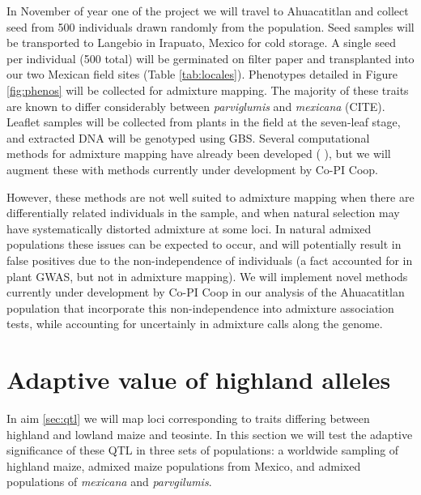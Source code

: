 In November of year one of the project we will travel to Ahuacatitlan and collect seed from 500 individuals drawn randomly from the population.  Seed samples will be transported to Langebio in Irapuato, Mexico for cold storage. A single seed per individual (500 total) will be germinated on filter paper and transplanted into our two Mexican field sites (Table \ref{tab:locales}).  Phenotypes detailed in Figure \ref{fig:phenos} will be collected for admixture mapping.  The majority of these traits are known to differ considerably between \emph{parviglumis} and \emph{mexicana} (CITE).  Leaflet samples will be collected from plants in the field at the seven-leaf stage, and extracted DNA will be genotyped using GBS.  Several computational methods for admixture mapping have already been developed (  \citet{winkler2010admixture}), but we will augment these with methods currently under development by Co-PI Coop.  

However, these methods are not well suited to admixture mapping when there are differentially related individuals in the sample, and when natural selection may have systematically distorted admixture at some loci. In natural admixed populations these issues can be expected to occur, and will potentially result in false positives due to the non-independence of individuals (a fact accounted for in plant GWAS, but not in admixture mapping). We will implement novel methods currently under development by Co-PI Coop in our analysis of the Ahuacatitlan population that incorporate this non-independence into admixture association tests, while accounting for uncertainly in admixture calls along the genome. 


\section{Adaptive value of highland alleles} \label{sec:selection}

In aim \ref{sec:qtl} we will map loci corresponding to traits differing between highland and lowland maize and teosinte. In this section we will test the adaptive significance of these QTL in three sets of populations: a worldwide sampling of highland maize, admixed maize populations from Mexico, and admixed populations of \emph{mexicana} and \emph{parvgilumis}. 

